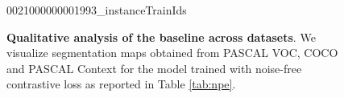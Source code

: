 \begin{figure}[thp]
\centering
  \vspace{-0.5em}
 
  \hspace{4em}
  \hspace{1.5em}
  \hspace{1.5em}
  \vspace{-0.02em} %
  \vspace{-0.05em}
{0021}{000000001993_instanceTrainIds}


\caption[\textbf{Qualitative analysis of the baseline across datasets}]{\textbf{Qualitative analysis of the baseline across datasets}. We visualize segmentation maps obtained from PASCAL VOC, COCO and PASCAL Context for the model trained with noise-free contrastive loss as reported in Table \ref{tab:npe}.}
\label{fig:qualitative_alldatabaseline}
\end{figure}

  